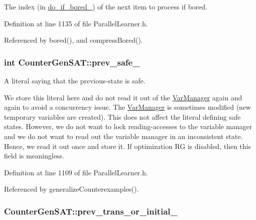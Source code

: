 The index (in \hyperlink{classCounterGenSAT_ae4f7bf80b40a44580fde913f300ac4c1}{do\-\_\-if\-\_\-bored\-\_\-}) of the next item to process if bored. 



Definition at line 1135 of file Parallel\-Learner.\-h.



Referenced by bored(), and compress\-Bored().

\hypertarget{classCounterGenSAT_a6b1ebfdef38c7463a2594ace7bd72a8d}{
\subsubsection[{prev\-\_\-safe\-\_\-}]{\setlength{\rightskip}{0pt plus 5cm}int Counter\-Gen\-S\-A\-T\-::prev\-\_\-safe\-\_\-\hspace{0.3cm}{\ttfamily [protected]}}}\label{classCounterGenSAT_a6b1ebfdef38c7463a2594ace7bd72a8d}


A literal saying that the previous-\/state is safe. 

We store this literal here and do not read it out of the \hyperlink{classVarManager}{Var\-Manager} again and again to avoid a concurrency issue. The \hyperlink{classVarManager}{Var\-Manager} is sometimes modified (new temporary variables are created). This does not affect the literal defining safe states. However, we do not want to lock reading-\/accesses to the variable manager and we do not want to read out the variable manager in an inconsistent state. Hence, we read it out once and store it. If optimization R\-G is disabled, then this field is meaningless. 

Definition at line 1109 of file Parallel\-Learner.\-h.



Referenced by generalize\-Counterexamples().

\hypertarget{classCounterGenSAT_a526507443918740c5ac2ae24886d1017}{
\subsubsection[{prev\-\_\-trans\-\_\-or\-\_\-initial\-\_\-}]{ Counter\-Gen\-S\-A\-T\-::prev\-\_\-trans\-\_\-or\-\_\-initial\-\_\-\hspace{0.3cm}{\ttfamily [protected]}}}\label{classCounterGenSAT_a526507443918740c5ac2ae24886d1017}



